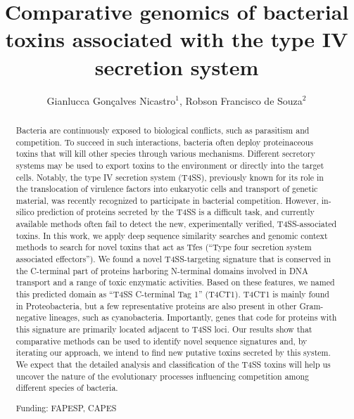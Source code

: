 \documentclass[twoside]{article}
\title{\vspace{-15mm}\fontsize{24pt}{10pt}\selectfont\textbf{Comparative genomics of bacterial toxins associated with the type IV secretion system}} %
\author{Gianlucca Gon\c{c}alves Nicastro$^1$, Robson Francisco de Souza$^2$}
\affil{1 INSTITUTO DE CI\^ENCIAS BIOM\'EDICAS), DEPARTAMENTO DE MICROBIOLOGIA, USP\\ 2 USP\\ }
\date{}
\begin{document}
\maketitle %

\thispagestyle{fancy} %


\begin{abstract}
Bacteria are continuously exposed to biological conflicts, such as parasitism and competition. To succeed in such interactions, bacteria often deploy proteinaceous toxins that will kill other species through various mechanisms. Different secretory systems may be used to export toxins to the environment or directly into the target cells. Notably, the type IV secretion system (T4SS), previously known for its role in the translocation of virulence factors into eukaryotic cells and transport of genetic material, was recently recognized to participate in bacterial competition. However, in-silico prediction of proteins secreted by the T4SS is a difficult task, and currently available methods often fail to detect the new, experimentally verified, T4SS-associated toxins. In this work, we apply deep sequence similarity searches and genomic context methods to search for novel toxins that act as Tfes (``Type four secretion system associated effectors''). We found a novel T4SS-targeting signature that is conserved in the C-terminal part of proteins harboring N-terminal domains involved in DNA transport and a range of toxic enzymatic activities. Based on these features, we named this predicted domain as ``T4SS C-terminal Tag 1'' (T4CT1). T4CT1 is mainly found in Proteobacteria, but a few representative proteins are also present in other Gram-negative lineages, such as cyanobacteria. Importantly, genes that code for proteins with this signature are primarily located adjacent to T4SS loci. Our results show that comparative methods can be used to identify novel sequence signatures and, by iterating our approach, we intend to find new putative toxins secreted by this system. We expect that the detailed analysis and classification of the T4SS toxins will help us uncover the nature of the evolutionary processes influencing competition among different species of bacteria.

Funding: FAPESP, CAPES
\end{abstract}
\end{document}
